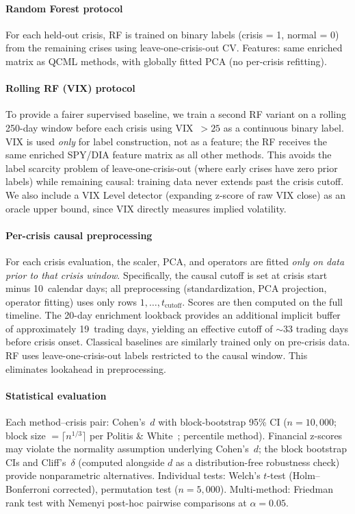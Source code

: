 \documentclass[3p]{elsarticle}
\begin{document}
\paragraph{Random Forest protocol}
For each held-out crisis, RF is trained on binary labels (crisis = 1,
normal = 0) from the remaining crises using leave-one-crisis-out CV.
Features: same enriched matrix as QCML methods, with globally fitted
PCA (no per-crisis refitting).

\paragraph{Rolling RF (VIX) protocol}
To provide a fairer supervised baseline, we train a second RF variant
on a rolling 250-day window before each crisis using VIX~$> 25$ as a
continuous binary label.  VIX is used \emph{only} for label construction,
not as a feature; the RF receives the same enriched SPY/DIA feature
matrix as all other methods.  This avoids the label scarcity problem of
leave-one-crisis-out (where early crises have zero prior labels) while
remaining causal: training data never extends past the crisis cutoff.
We also include a VIX Level detector (expanding z-score of raw VIX
close) as an oracle upper bound, since VIX directly measures implied
volatility.

\paragraph{Per-crisis causal preprocessing}
For each crisis evaluation, the scaler, PCA, and operators are fitted
\emph{only on data prior to that crisis window}.  Specifically, the
causal cutoff is set at crisis start minus 10~calendar days; all
preprocessing (standardization, PCA projection, operator fitting) uses
only rows $1, \ldots, t_{\text{cutoff}}$.  Scores are then computed
on the full timeline.  The 20-day enrichment lookback provides an
additional implicit buffer of approximately 19~trading days, yielding
an effective cutoff of ${\sim}33$ trading days before crisis onset.  Classical baselines are similarly trained only
on pre-crisis data.  RF uses leave-one-crisis-out labels restricted to
the causal window.  This eliminates lookahead in preprocessing.

\paragraph{Statistical evaluation}
Each method--crisis pair: Cohen's~$d$ with block-bootstrap 95\% CI
($n = 10{,}000$; block size $= \lceil n^{1/3} \rceil$ per
Politis \& White~\cite{politis2004}; percentile method).  Financial z-scores may violate
the normality assumption underlying Cohen's~$d$; the block bootstrap
CIs and Cliff's~$\delta$ (computed alongside $d$ as a
distribution-free robustness check) provide nonparametric alternatives.
Individual tests: Welch's $t$-test (Holm--Bonferroni corrected),
permutation test ($n = 5{,}000$).  Multi-method: Friedman rank test
with Nemenyi post-hoc pairwise comparisons at $\alpha = 0.05$.
\end{document}
